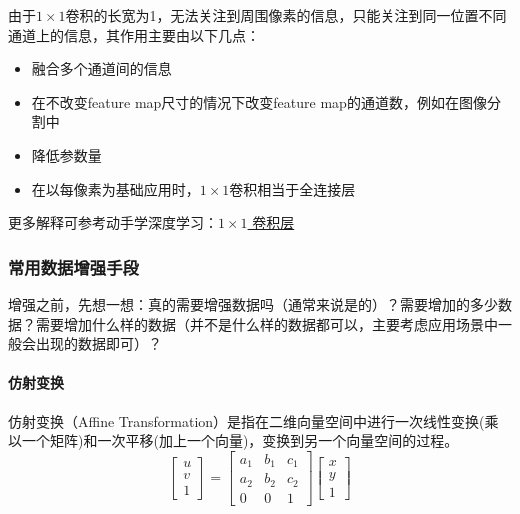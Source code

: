 由于$1\times 1$卷积的长宽为1，无法关注到周围像素的信息，只能关注到同一位置不同通道上的信息，其作用主要由以下几点：
\begin{itemize}
	\item 融合多个通道间的信息
	\item 在不改变feature map尺寸的情况下改变feature map的通道数，例如在图像分割中
	\item 降低参数量
	\item 在以每像素为基础应用时，$1\times 1$卷积相当于全连接层
\end{itemize}
更多解释可参考动手学深度学习：\href{https://zh-v2.d2l.ai/chapter_convolutional-neural-networks/channels.html#times-1}{$1\times 1$  卷积层}

\subsubsection{常用数据增强手段}
增强之前，先想一想：真的需要增强数据吗（通常来说是的）？需要增加的多少数据？需要增加什么样的数据（并不是什么样的数据都可以，主要考虑应用场景中一般会出现的数据即可）？
\paragraph{仿射变换}
仿射变换（Affine Transformation）是指在二维向量空间中进行一次线性变换(乘以一个矩阵)和一次平移(加上一个向量)，变换到另一个向量空间的过程。
$$
\left[\begin{array}{l}
	u \\
	v \\
	1
\end{array}\right]=\left[\begin{array}{ccc}
	a_{1} & b_{1} & c_{1} \\
	a_{2} & b_{2} & c_{2} \\
	0 & 0 & 1
\end{array}\right]\left[\begin{array}{l}
	x \\
	y \\
	1
\end{array}\right]
$$

